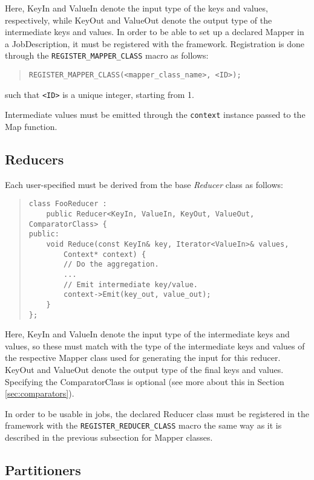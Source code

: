 \documentclass{article}
\begin{document}
Here, KeyIn and ValueIn denote the input type of the keys and values, respectively, while KeyOut and ValueOut denote the output type of the intermediate keys and values.
In order to be able to set up a declared Mapper in a JobDescription, it must be registered with the framework. Registration is done through the \texttt{REGISTER\_MAPPER\_CLASS} macro as follows:

\begin{quote}
\begin{verbatim}
REGISTER_MAPPER_CLASS(<mapper_class_name>, <ID>);
\end{verbatim}
\end{quote}

such that \texttt{<ID>} is a unique integer, starting from 1.

Intermediate values must be emitted through the \texttt{context} instance passed to the Map function.

\subsection{Reducers}

Each user-specified must be derived from the base \emph{Reducer} class as follows:

\begin{quote}
\begin{verbatim}
class FooReducer :
    public Reducer<KeyIn, ValueIn, KeyOut, ValueOut, ComparatorClass> {
public:
    void Reduce(const KeyIn& key, Iterator<ValueIn>& values,
        Context* context) {
        // Do the aggregation.
        ...
        // Emit intermediate key/value.
        context->Emit(key_out, value_out);
    }
};
\end{verbatim}
\end{quote}

Here, KeyIn and ValueIn denote the input type of the intermediate keys and values, so these must match with the type of the intermediate keys and values of the respective Mapper class used for generating the input for this reducer. KeyOut and ValueOut denote the output type of the final keys and values.
Specifying the ComparatorClass is optional (see more about this in Section \ref{sec:comparators}).

In order to be usable in jobs, the declared Reducer class must be registered in the framework with the \texttt{REGISTER\_REDUCER\_CLASS} macro the same way as it is described in the previous subsection for Mapper classes.

\subsection{Partitioners}
\end{document}
